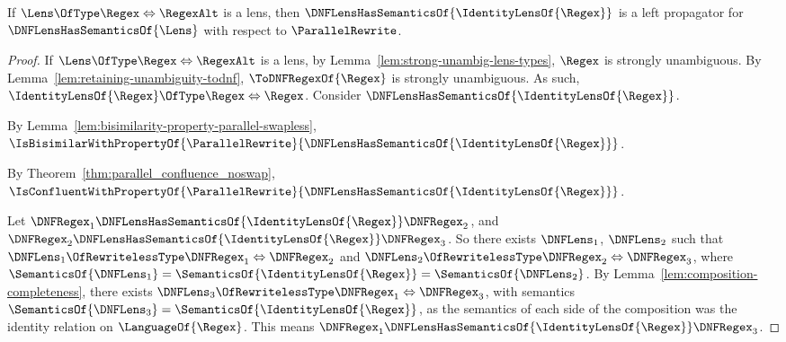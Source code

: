 \documentclass[sigplan,acmsmall]{acmart}
\begin{document}
\begin{lemma}
  \label{lem:id-left-prop}
  If $\Lens \OfType \Regex \Leftrightarrow \RegexAlt$ is a lens,
  then $\DNFLensHasSemanticsOf{\IdentityLensOf{\Regex}}$ is a left propagator
  for $\DNFLensHasSemanticsOf{\Lens}$ with respect to $\ParallelRewrite$.
\end{lemma}
\begin{proof}
  If $\Lens \OfType \Regex \Leftrightarrow \RegexAlt$ is a lens,
  by Lemma~\ref{lem:strong-unambig-lens-types},
  $\Regex$ is strongly unambiguous.
  By Lemma~\ref{lem:retaining-unambiguity-todnf}, $\ToDNFRegexOf{\Regex}$ is
  strongly unambiguous.
  As such, $\IdentityLensOf{\Regex} \OfType \Regex \Leftrightarrow \Regex$.
  Consider $\DNFLensHasSemanticsOf{\IdentityLensOf{\Regex}}$.
  
  By Lemma~\ref{lem:bisimilarity-property-parallel-swapless},
  $\IsBisimilarWithPropertyOf{\ParallelRewrite}{\DNFLensHasSemanticsOf{\IdentityLensOf{\Regex}}}$.
  
  By Theorem~\ref{thm:parallel_confluence_noswap},
  $\IsConfluentWithPropertyOf{\ParallelRewrite}{\DNFLensHasSemanticsOf{\IdentityLensOf{\Regex}}}$.
  
  Let $\DNFRegex_1 \DNFLensHasSemanticsOf{\IdentityLensOf{\Regex}} \DNFRegex_2$,
  and $\DNFRegex_2 \DNFLensHasSemanticsOf{\IdentityLensOf{\Regex}} \DNFRegex_3$.
  So there exists $\DNFLens_1$, $\DNFLens_2$ such that
  $\DNFLens_1 \OfRewritelessType \DNFRegex_1 \Leftrightarrow \DNFRegex_2$ and
  $\DNFLens_2 \OfRewritelessType \DNFRegex_2 \Leftrightarrow \DNFRegex_3$,
  where $\SemanticsOf{\DNFLens_1} = \SemanticsOf{\IdentityLensOf{\Regex}} =
  \SemanticsOf{\DNFLens_2}$.
  By Lemma~\ref{lem:composition-completeness}, there exists
  $\DNFLens_3 \OfRewritelessType \DNFRegex_1 \Leftrightarrow \DNFRegex_3$, with
  semantics $\SemanticsOf{\DNFLens_3} = \SemanticsOf{\IdentityLensOf{\Regex}}$,
  as the semantics of each side of the composition was the identity relation
  on $\LanguageOf{\Regex}$.  This means
  $\DNFRegex_1 \DNFLensHasSemanticsOf{\IdentityLensOf{\Regex}} \DNFRegex_3$.


\end{proof}
\end{document}
